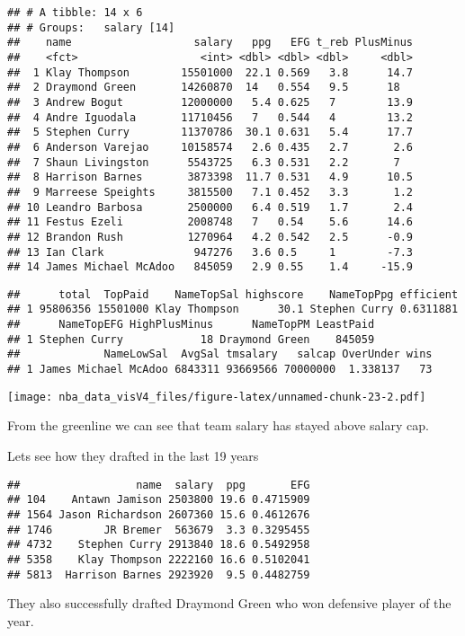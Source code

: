 \documentclass[]{article}
\begin{document}
\begin{verbatim}
## # A tibble: 14 x 6
## # Groups:   salary [14]
##    name                   salary   ppg   EFG t_reb PlusMinus
##    <fct>                   <int> <dbl> <dbl> <dbl>     <dbl>
##  1 Klay Thompson        15501000  22.1 0.569   3.8      14.7
##  2 Draymond Green       14260870  14   0.554   9.5      18  
##  3 Andrew Bogut         12000000   5.4 0.625   7        13.9
##  4 Andre Iguodala       11710456   7   0.544   4        13.2
##  5 Stephen Curry        11370786  30.1 0.631   5.4      17.7
##  6 Anderson Varejao     10158574   2.6 0.435   2.7       2.6
##  7 Shaun Livingston      5543725   6.3 0.531   2.2       7  
##  8 Harrison Barnes       3873398  11.7 0.531   4.9      10.5
##  9 Marreese Speights     3815500   7.1 0.452   3.3       1.2
## 10 Leandro Barbosa       2500000   6.4 0.519   1.7       2.4
## 11 Festus Ezeli          2008748   7   0.54    5.6      14.6
## 12 Brandon Rush          1270964   4.2 0.542   2.5      -0.9
## 13 Ian Clark              947276   3.6 0.5     1        -7.3
## 14 James Michael McAdoo   845059   2.9 0.55    1.4     -15.9
\end{verbatim}

\begin{verbatim}
##      total  TopPaid    NameTopSal highscore    NameTopPpg efficient
## 1 95806356 15501000 Klay Thompson      30.1 Stephen Curry 0.6311881
##      NameTopEFG HighPlusMinus      NameTopPM LeastPaid
## 1 Stephen Curry            18 Draymond Green    845059
##             NameLowSal  AvgSal tmsalary   salcap OverUnder wins
## 1 James Michael McAdoo 6843311 93669566 70000000  1.338137   73
\end{verbatim}

\texttt{[image: nba\_data\_visV4\_files/figure-latex/unnamed-chunk-23-2.pdf]}

From the greenline we can see that team salary has stayed above salary
cap.

Lets see how they drafted in the last 19 years

\begin{verbatim}
##                  name  salary  ppg       EFG
## 104    Antawn Jamison 2503800 19.6 0.4715909
## 1564 Jason Richardson 2607360 15.6 0.4612676
## 1746        JR Bremer  563679  3.3 0.3295455
## 4732    Stephen Curry 2913840 18.6 0.5492958
## 5358    Klay Thompson 2222160 16.6 0.5102041
## 5813  Harrison Barnes 2923920  9.5 0.4482759
\end{verbatim}

They also successfully drafted Draymond Green who won defensive player
of the year.
\end{document}
